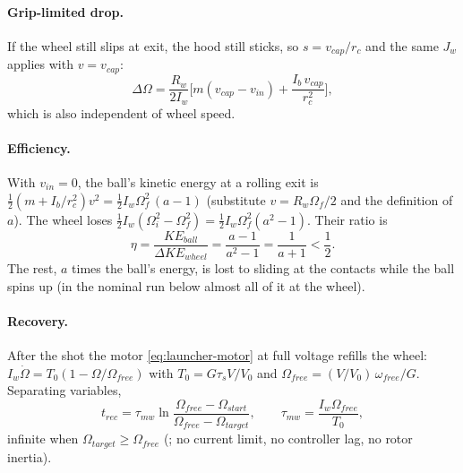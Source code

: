 \paragraph{Grip-limited drop.} If the wheel still slips at exit, the hood still sticks, so $s = v_{cap}/r_c$
and the same $J_w$ applies with $v = v_{cap}$:
\begin{equation}
  \Delta\Omega = \frac{R_w}{2 I_w}\Big[m(v_{cap} - v_{in}) + \frac{I_b\,v_{cap}}{r_c^2}\Big],
  \label{eq:launcher-dropgrip}
\end{equation}
which is also independent of wheel speed.

\paragraph{Efficiency.} With $v_{in} = 0$, the ball's kinetic energy at a rolling exit is
$\tfrac12(m + I_b/r_c^2)v^2 = \tfrac12 I_w\Omega_f^2\,(a - 1)$ (substitute $v = R_w\Omega_f/2$ and the
definition of $a$). The wheel loses $\tfrac12 I_w(\Omega_i^2 - \Omega_f^2) = \tfrac12 I_w\Omega_f^2(a^2 - 1)$.
Their ratio is
\begin{equation}
  \eta = \frac{KE_{ball}}{\Delta KE_{wheel}} = \frac{a - 1}{a^2 - 1} = \frac{1}{a + 1} < \frac12 .
  \label{eq:launcher-eta}
\end{equation}
The rest, $a$ times the ball's energy, is lost to sliding at the contacts while the ball spins up (in the
nominal run below almost all of it at the wheel).

\paragraph{Recovery.} After the shot the motor \eqref{eq:launcher-motor} at full voltage refills the wheel:
$I_w\dot\Omega = T_0(1 - \Omega/\Omega_{free})$ with $T_0 = G\tau_s V/V_0$ and
$\Omega_{free} = (V/V_0)\,\omega_{free}/G$. Separating variables,
\begin{equation}
  t_{rec} = \tau_{mw}\ln\frac{\Omega_{free} - \Omega_{start}}{\Omega_{free} - \Omega_{target}}, \qquad
  \tau_{mw} = \frac{I_w\Omega_{free}}{T_0},
  \label{eq:launcher-recovery}
\end{equation}
infinite when $\Omega_{target} \ge \Omega_{free}$ (; no current limit, no controller lag,
no rotor inertia).

